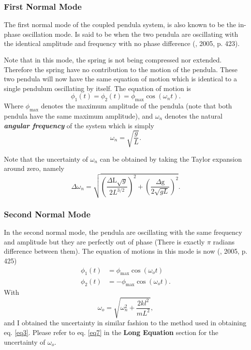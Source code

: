 \documentclass[aps,prl,reprint,10pt,amsmath,amssymb,superscriptaddress,a4paper]{revtex4-2}
\begin{document}
\subsubsection{First Normal Mode}
The first normal mode of the coupled pendula system, is also known to be the in-phase oscillation mode. Is said to be when the two pendula are oscillating with the identical amplitude and frequency with no phase difference (\citeauthor{Taylor}, 2005, p. 423).

Note that in this mode, the spring is not being compressed nor extended. Therefore the spring have no contribution to the motion of the pendula. These two pendula will now have the same equation of motion which is identical to a single pendulum oscillating by itself. The equation of motion is
\begin{equation}
    \phi_1(t) = \phi_2(t) = \phi_{\text{max}} \cos (\omega_n t). \label{eq1}
\end{equation}
Where $\phi_{\text{max}}$ denotes the maximum amplitude of the pendula (note that both pendula have the same maximum amplitude), and $\omega_n$ denotes the natural \textbf{\emph{angular frequency}} of the system which is simply
\begin{equation}
    \omega_n = \sqrt{\frac{g}{L}}. \label{eq2}
\end{equation}

Note that the uncertainty of $\omega_n$ can be obtained by taking the Taylor expansion around zero, namely
\begin{equation}
    \Delta \omega_n = \sqrt{\left(\frac{\text{$\Delta $L} \sqrt{g}}{2 L^{3/2}}\right)^2+\left(\frac{\text{$\Delta $g}}{2 \sqrt{g L}}\right)^2}. \label{eq3}
\end{equation}


\subsubsection{Second Normal Mode}
In the second normal mode, the pendula are oscillating with the same frequency and amplitude but they are perfectly out of phase (There is exactly $\pi$ radians difference between them). The equation of motions in this mode is now (\citeauthor{Taylor}, 2005, p. 425)
\begin{align}
    \phi_1(t) &= \phi_{\text{max}} \cos (\omega_o t)\\
    \phi_2(t) &= -\phi_{\text{max}} \cos (\omega_o t).
\end{align} 
With 
\begin{equation}
    \omega_o = \sqrt{\omega_n^2 + \frac{2kl^2}{mL^2}}, \label{eq6}
\end{equation}
and I obtained the uncertainty in similar fashion to the method used in obtaining eq. \ref{eq3}. Please refer to eq. \ref{eq7} in the \textbf{Long Equation} section for the uncertainty of $\omega_o$.
\end{document}

